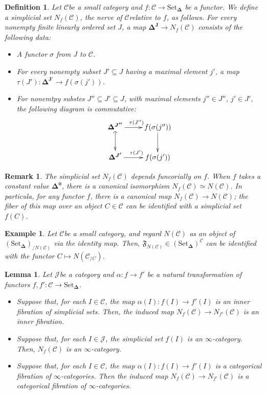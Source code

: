 \documentclass[12pt]{amsart}
\newcommand{\8}{\ensuremath{\infty}}
\newcommand{\C}{\ensuremath{\mathscr{C}}}
\newcommand{\J}{\ensuremath{\mathscr{J}}}
\newcommand{\Simplex}[1][n]{\ensuremath{\boldsymbol{\Delta^{#1}}}}
\newcommand{\SSet}{\ensuremath{\text{Set}_{\boldsymbol{\Delta}}}}
\newtheorem{definition}{Definition}
\newtheorem{lemma}{Lemma}
\newtheorem{remark}{Remark}
\newtheorem{example}{Example}
\begin{document}
\begin{definition}
  Let \C be a small category and $f : \C \rightarrow \SSet$ be a functor. We define a simplicial set $N_f(\C)$, the nerve of \C relative to $f$, as follows. For every nonempty finite linearly ordered set $J$, a map $\Simplex[J] \rightarrow N_f(\C)$ consists of the following data:
  \begin{itemize}
    \item A functor $\sigma$ from $J$ to \C.
    \item For every nonempty subset $J' \subseteq J$ having a maximal element $j'$, a map $\tau(J') : \Simplex[J'] \rightarrow f(\sigma(j'))$.
    \item For nonemtpy substes $J'' \subseteq J' \subseteq J$, with maximal elements $j'' \in J''$, $j' \in J'$, the following diagram is commutative:
          $$
            \begin{xy}
              \xymatrix{
                \Simplex[J'']\ar[r]^{\tau(J'')}\ar@{(->}[d] & f(\sigma(j''))\ar[d] \\
                \Simplex[J']\ar[r]^{\tau(J')} & f(\sigma(j'))
              }
            \end{xy}
          $$
  \end{itemize}
\end{definition}

\begin{remark}
  The simplicial set $N_f(\C)$ depends funcorially on $f$. When $f$ takes a constant value \Simplex[0], there is a canonical isomorphism $N_f(\C) \simeq N(\C)$. In particula, for any functor $f$, there is a canonical map $N_f(\C) \rightarrow N(\C)$; the fiber of this map over an object $C \in \C$ can be identified with a simplicial set $f(C)$.
\end{remark}

\begin{example}
  Let \C be a small category, and regard $N(\C)$ as an object of $(\SSet)_{/N(\C)}$ via the identity map. Then, $\mathfrak{F}_{N(\C)} \in (\SSet)^\C$ can be identified with the functor $C \mapsto N(\C_{/C})$.
\end{example}

\begin{lemma}
  Let \J be a category and $\alpha : f \rightarrow f'$ be a natural transformation of functors $f, f' : \C \rightarrow \SSet$.
  \begin{itemize}
    \item Suppose that, for each $I \in \C$, the map $\alpha(I) : f(I) \rightarrow f'(I)$ is an inner fibration of simplicial sets. Then, the induced map $N_f(\C) \rightarrow N_{f'}(\C)$ is an inner fibration.
    \item Suppose that, for each $I \in \J$, the simplicial set $f(I)$ is an \8-category. Then, $N_f(\C)$ is an \8-category.
    \item Suppose that, for each $I \in \C$, the map $\alpha(I) : f(I) \rightarrow f'(I)$ is a categorical fibration of \8-categories. Then the induced map $N_f(\C) \rightarrow N_{f'}(\C)$ is a categorical fibration of \8-categories.~
  \end{itemize}
\end{lemma}
\end{document}
